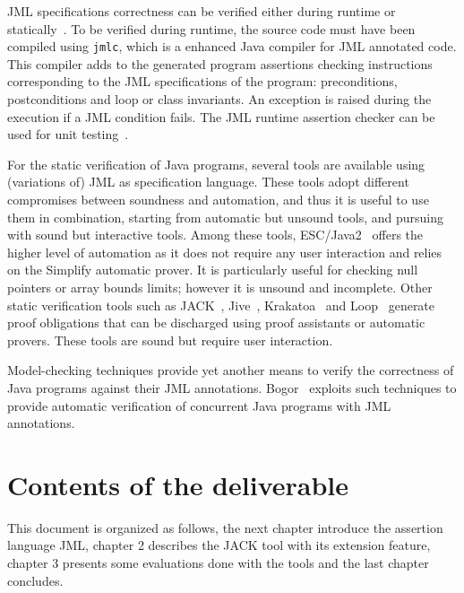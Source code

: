 JML specifications correctness can be verified either during runtime
or statically~\cite{BurdyCCEKLLP03}. To be verified during runtime, the
source code must have been compiled using \texttt{jmlc}, which is a
enhanced Java compiler for JML annotated code. This compiler adds to
the generated program assertions checking instructions corresponding
to the JML specifications of the program: preconditions, postconditions 
and loop or class invariants. An exception is raised during the execution 
if a JML condition fails. The JML runtime assertion checker can be used
for unit testing~\cite{CL02:ecoop}.


For the static verification of Java programs, several tools are
available using (variations of) JML as specification language. These
tools adopt different compromises between soundness and automation,
and thus it is useful to use them in combination, starting from
automatic but unsound tools, and pursuing with sound but interactive
tools.  Among these tools, ESC/Java2~\cite{CK04:cassis} offers the higher
level of automation as it does not require any user interaction and
relies on the Simplify automatic prover. It is particularly useful for
checking null pointers or array bounds limits; however it is unsound
and incomplete. Other static verification tools such as
JACK~\cite{BRL03:fme}, Jive~\cite{jive}, Krakatoa~\cite{MPU03:jlap}
and Loop~\cite{vdBJ01:tacas} generate proof obligations that can be
discharged using proof assistants or automatic provers. These tools
are sound but require user interaction.

Model-checking techniques provide yet another means to verify the
correctness of Java programs against their JML
annotations. Bogor~\cite{robby+04:tacas} exploits such techniques to 
provide automatic verification of concurrent Java programs
with JML annotations.



\section{Contents of the deliverable}
This document is organized as follows, the next chapter introduce the
assertion language JML, chapter 2 describes the JACK tool with its
extension feature, chapter 3 presents some evaluations done with the
tools and the last chapter concludes.
